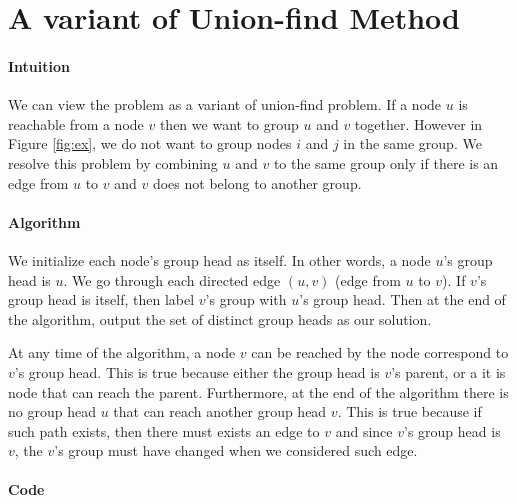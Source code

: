 \documentclass[12pt,letterpaper]{article}
\begin{document}
\section{A variant of Union-find Method}

\paragraph{Intuition}

We can view the problem as a variant of union-find problem. If a node $u$ is reachable from a node $v$ then we want to group $u$ and $v$ together.
However in Figure \ref{fig:ex}, we do not want to group nodes $i$ and $j$ in the same group. 
We resolve this problem by combining $u$ and $v$ to the same group only if there is an edge from $u$ to $v$ and $v$ does not belong to another group.

\paragraph{Algorithm}
We initialize each node's group head as itself. In other words, a node $u$'s group head is $u$.
We go through each directed edge $(u,v)$ (edge from $u$ to $v$). If $v$'s group head is itself, then label $v$'s group with $u$'s group head.
Then at the end of the algorithm, output the set of distinct group heads as our solution.  

At any time of the algorithm, a node $v$ can be reached by the node correspond to $v$'s group head.
This is true because either the group head is $v$'s parent, or a it is node that can reach the parent.
Furthermore, at the end of the algorithm there is no group head $u$ that can reach another group head $v$.
This is true because if such path exists, then there must exists an edge to $v$ and since $v$'s group head is $v$, the $v$'s group must have changed when we considered such edge.

\paragraph*{Code}
\end{document}
